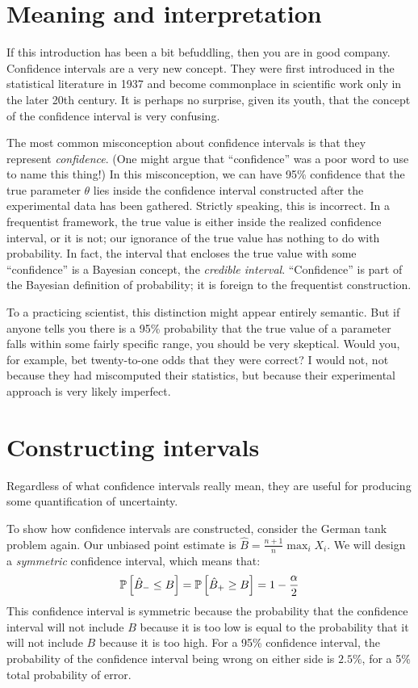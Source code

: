 \section{Meaning and interpretation}

If this introduction has been a bit befuddling, then you are in good company.
Confidence intervals are a very new concept. They were first introduced in the statistical literature in 1937 and become commonplace in scientific work only in the later 20th century.
It is perhaps no surprise, given its youth, that the concept of the confidence interval
is very confusing.

The most common misconception about confidence intervals is that they represent
\emph{confidence}. (One might argue that ``confidence'' was a poor word to use to name this
thing!) In this misconception, we can have 95\% confidence that the true parameter $\theta$
lies inside the confidence interval constructed after the experimental data has been gathered.
Strictly speaking, this is incorrect. In a frequentist framework, the true
value is either inside the realized confidence interval, or it is not; our ignorance of
the true value has nothing to do with probability. In fact, the interval that encloses
the true value with some ``confidence'' is a Bayesian concept, the \emph{credible interval}.
``Confidence'' is part of the Bayesian definition of probability; it is foreign to the
frequentist construction.

To a practicing scientist, this distinction might appear entirely semantic. But if anyone
tells you there is a 95\% probability that the true value of a parameter falls within
some fairly specific range, you should be very skeptical. Would you, for example, bet
twenty-to-one odds that they were correct? I would not, not because they had miscomputed
their statistics, but because their experimental approach is very likely imperfect.

\section{Constructing intervals}

Regardless of what confidence intervals really mean, they are useful for
producing some quantification of uncertainty.

To show how confidence intervals are constructed, consider the German
tank problem again. Our unbiased point estimate is $\hat{B} = \tfrac{n+1}{n} \max_i X_i$.
We will design a \emph{symmetric} confidence interval, which means that:
\begin{equation*}
    \mathbb{P}\left[{\hat{B}_- \leq B}\right] = \mathbb{P}\left[{\hat{B}_+ \geq B}\right] = 1 - \frac{\alpha}{2}
\end{equation*}
This confidence interval is symmetric because the probability that the confidence interval
will not include $B$ because it is too low is equal to the probability that it will not
include $B$ because it is too high. For a 95\% confidence interval, the probability of the
confidence interval being wrong on either side is $2.5\%$, for a 5\% total probability of
error.

